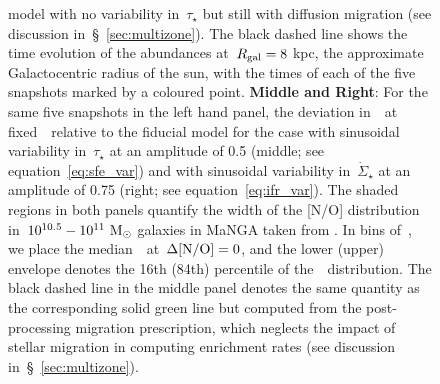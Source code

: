 \documentclass[ms.tex]{subfiles}
\begin{document}
\begin{figure}
{model with no variability in~$\tau_\star$ but still with diffusion migration
(see discussion in~\S~\ref{sec:multizone}).
The black dashed line shows the time evolution of the abundances at~$R_\text{gal} = 8$
kpc, the approximate Galactocentric radius of the sun, with the times of each
of the five snapshots marked by a coloured point.
\textbf{Middle and Right}: For the same five snapshots in the left hand panel,
the deviation in~\no~at fixed~\oh~relative to the fiducial model for the case
with sinusoidal variability in~$\tau_\star$ at an amplitude of 0.5 (middle; see
equation~\ref{eq:sfe_var})
and with sinusoidal variability in~$\dot{\Sigma}_\star$ at an amplitude of 0.75
(right; see equation~\ref{eq:ifr_var}).
The shaded regions in both panels quantify the width of the [N/O] distribution
in~$10^{10.5} - 10^{11}~\text{M}_\odot$ galaxies in MaNGA taken from
\citet{Schaefer2020}.
In bins of~\oh, we place the median~\no~at~$\Delta\text{[N/O]} = 0$, and the lower
(upper) envelope denotes the 16th (84th) percentile of the~\no~distribution.
The black dashed line in the middle panel denotes the same quantity as the
corresponding solid green line but computed from the post-processing migration
prescription, which neglects the impact of stellar migration in computing
enrichment rates (see discussion in~\S~\ref{sec:multizone}).
}
\label{fig:schaefer_comp}
\end{figure}
\end{document}
